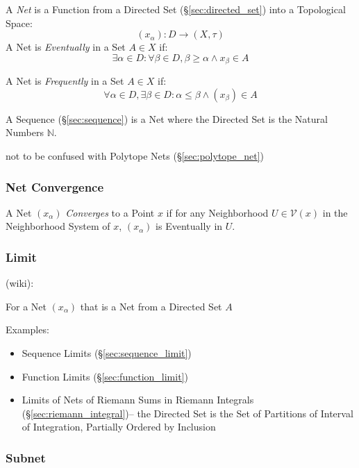 A \emph{Net} is a Function from a Directed Set (\S\ref{sec:directed_set}) into
a Topological Space:
\[
  (x_\alpha) : D \rightarrow (X, \tau)
\]
A Net is \emph{Eventually} in a Set $A \in X$ if:
\[
  \exists \alpha \in D
  : \forall \beta \in D, \beta \geq \alpha \wedge x_\beta \in A
\]

A Net is \emph{Frequently} in a Set $A \in X$ if:
\[
  \forall \alpha \in D, \exists \beta \in D
  : \alpha \leq \beta \wedge (x_\beta) \in A
\]

A Sequence (\S\ref{sec:sequence}) is a Net where the Directed Set is the
Natural Numbers $\mathbb{N}$.

\fist not to be confused with Polytope Nets (\S\ref{sec:polytope_net})



\subsubsection{Net Convergence}\label{sec:net_convergence}

A Net $(x_\alpha)$ \emph{Converges} to a Point $x$ if for any
Neighborhood $U \in \mathcal{V}(x)$ in the Neighborhood System of $x$,
$(x_\alpha)$ is Eventually in $U$.



\subsubsection{Limit}\label{sec:net_limit}

(wiki):

For a Net $(x_\alpha)$ that is a Net from a Directed Set $A$

Examples:

\begin{itemize}
  \item Sequence Limits (\S\ref{sec:sequence_limit})
  \item Function Limits (\S\ref{sec:function_limit})
  \item Limits of Nets of Riemann Sums in Riemann Integrals
    (\S\ref{sec:riemann_integral})-- the Directed Set is the Set of Partitions
    of Interval of Integration, Partially Ordered by Inclusion
\end{itemize}



\subsubsection{Subnet}\label{sec:subnet}

